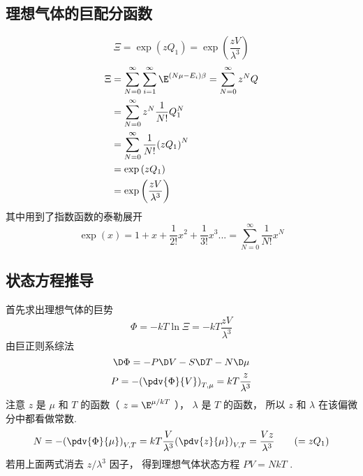 
\subsection{理想气体的巨配分函数}
\noindent{}
\begin{equation}\label{IdMCE_eq1}
\Xi  = \exp \left( {z{Q_1}} \right) = \exp \left( {\frac{zV}{\lambda ^3}} \right)
\end{equation}
\begin{equation}\label{IdMCE_eq2}
\begin{aligned}
\Xi & = \sum\limits_{N = 0}^\infty  {\sum\limits_{i = 1}^\infty  {\E^{\left( {N\mu  - {E_i}} \right)\beta }} }  = \sum\limits_{N = 0}^\infty  {{z^N}Q} \\
& = \sum\limits_{N = 0}^\infty  {{z^N}\frac{1}{N!}Q_1^N} \\
& = \sum\limits_{N = 0}^\infty  {\frac{1}{N!}{{\left( {z{Q_1}} \right)}^N}} \\
& = \exp \left( {z{Q_1}} \right) \\
& = \exp \left( {\frac{zV}{\lambda ^3}} \right){\kern 1pt} {\kern 1pt} {\kern 1pt} {\kern 1pt} {\kern 1pt} {\kern 1pt} {\kern 1pt}
\end{aligned}
\end{equation}
其中用到了指数函数的泰勒展开%
\begin{equation}\label{IdMCE_eq3}
\exp \left( x \right) = 1 + x + \frac{1}{2!}{x^2} + \frac{1}{3!}{x^3}... = \sum\limits_{N = 0}^\infty  {\frac{1}{N!}{x^N}}
\end{equation}

\subsection{状态方程推导}
首先求出理想气体的巨势
\begin{equation}\label{IdMCE_eq4}
\Phi  =  - kT\ln \Xi  =  - kT\frac{zV}{\lambda ^3}
\end{equation}
由巨正则系综法%
\begin{equation}\label{IdMCE_eq5}
\D \Phi  =  - P \D V - S \D T - N \D \mu
\end{equation}
\begin{equation}\label{IdMCE_eq6}
P =  - {\left( {\pdv{\Phi}{V}} \right)_{T,\mu }} = kT\frac{z}{\lambda ^3}
\end{equation}
注意 $z$ 是 $\mu $ 和 $T$ 的函数（ $z = {\E^{{\mu }/{{kT}}}}$ ）， $\lambda $ 是 $T$ 的函数， 所以 $z$ 和 $\lambda $ 在该偏微分中都看做常数.
\begin{equation}\label{IdMCE_eq7}
N =  - {\left( {\pdv{\Phi}{\mu}} \right)_{V,T}} = kT\frac{V}{\lambda ^3}{\left( {\pdv{z}{\mu}} \right)_{V,T}} = \frac{Vz}{\lambda ^3} 
\qquad
( = z{Q_1})
\end{equation}
若用上面两式消去 ${z}/{{{\lambda ^3}}}$ 因子， 得到理想气体状态方程 $PV = NkT$ .
  
